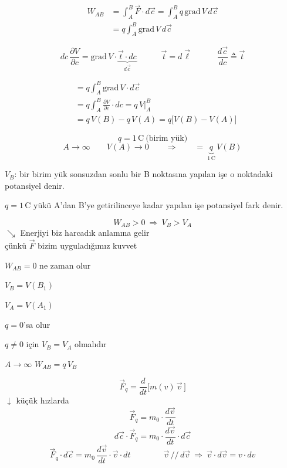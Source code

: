 \documentclass[11pt,a4paper]{article}
\begin{document}
\begin{align*}
W_{AB}&=\int_A^B\vec F\cdot d\vec c=\int_A^B q\,\mathrm{grad}\,V\,d\vec c\\
&=q\int_A^B\mathrm{grad}\,V\,d\vec c
\end{align*}

\[
dc\,\frac{\partial V}{\partial c}=\mathrm{grad}\,V\cdot\underbrace{\vec t\cdot dc}_{d\vec c}
\qquad\quad \vec t=d\vec\ell
\qquad\quad \frac{d\vec c}{dc}\triangleq\vec t
\]

\begin{align*}
&=q\int_A^B\mathrm{grad}\,V\cdot d\vec c\\
&=q\int_A^B\frac{\partial V}{\partial c}\cdot dc=q\,V\Big|_A^B\\
&=q\,V(B)-q\,V(A)=q\bigl[V(B)-V(A)\bigr]
\end{align*}

\[
q=1\,\mathrm{C}\ \text{(birim yük)}
\]
\[
A\to\infty\qquad V(A)\to 0\qquad\Longrightarrow\qquad =\ \underbrace{q}_{1\,\mathrm{C}}\,V(B)
\]

$V_B$: bir birim yük sonsuzdan sonlu bir B noktasına  yapılan işe o noktadaki potansiyel denir.

$q=1\,\mathrm{C}$ yükü A'dan B'ye getirilinceye kadar yapılan işe potansiyel fark denir.

\[
W_{AB}>0\ \Longrightarrow\ V_B>V_A
\]
\textcolor{kirmizikalem}{$\searrow$ Enerjiyi biz harcadık anlamına gelir\\ çünkü $\vec F$ bizim uyguladığımız kuvvet}

\medskip
\noindent$W_{AB}=0$ \quad ne zaman olur

\noindent\hspace*{1.2cm}$V_B=V(B_1)$

\noindent\hspace*{1.2cm}$V_A=V(A_1)$

\noindent\hspace*{1.2cm}$q=0$'sa olur

\noindent\hspace*{1.2cm}$q\neq 0$ için \quad $V_B=V_A$ olmalıdır

\noindent\hspace*{1.2cm}$A\to\infty$ \quad $W_{AB}=q\,V_B$

\[
\vec F_q=\frac{d}{dt}\bigl[m(v)\,\vec v\,\bigr]
\]
$\downarrow$ küçük hızlarda
\[
\vec F_q=m_0\cdot\frac{d\vec v}{dt}
\]
\[
d\vec c\cdot\vec F_q=m_0\cdot\frac{d\vec v}{dt}\cdot d\vec c
\]
\[
\vec F_q\cdot d\vec c=m_0\,\frac{d\vec v}{dt}\cdot\vec v\cdot dt
\qquad\qquad
\vec v\,/\!/\,d\vec v\ \Rightarrow\ \vec v\cdot d\vec v=v\cdot dv
\]
\end{document}
